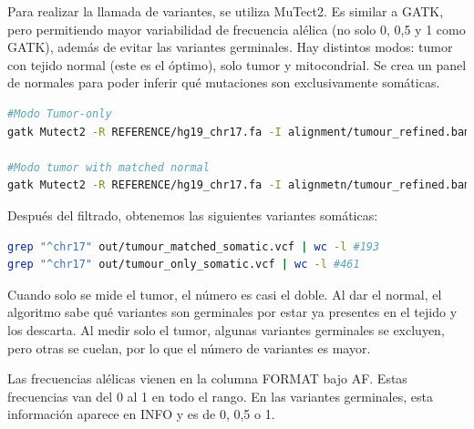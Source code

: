 Para realizar la llamada de variantes, se utiliza MuTect2. Es similar a GATK, pero permitiendo mayor variabilidad de frecuencia alélica (no solo 0, 0,5 y 1 como GATK), además de evitar las variantes germinales. Hay distintos modos: tumor con tejido normal (este es el óptimo), solo tumor y mitocondrial. Se crea un panel de normales para poder inferir qué mutaciones son exclusivamente somáticas. 
\begin{lstlisting}[language=bash]
#Modo Tumor-only 
gatk Mutect2 -R REFERENCE/hg19_chr17.fa -I alignment/tumour_refined.bam -O tumour_only_somatic.vcf

#Modo tumor with matched normal
gatk Mutect2 -R REFERENCE/hg19_chr17.fa -I alignmetn/tumour_refined.bam -I alignment/normal_refined.bam -normal Normal -O out/tumour_matched_somatic.vcf
\end{lstlisting}
 
Después del filtrado, obtenemos las siguientes variantes somáticas:
\begin{lstlisting}[language=bash]
grep "^chr17" out/tumour_matched_somatic.vcf | wc -l #193
grep "^chr17" out/tumour_only_somatic.vcf | wc -l #461
\end{lstlisting}
Cuando solo se mide el tumor, el número es casi el doble. Al dar el normal, el algoritmo sabe qué variantes son germinales por estar ya presentes en el tejido y los descarta. Al medir solo el tumor, algunas variantes germinales se excluyen, pero otras se cuelan, por lo que el número de variantes es mayor. 

Las frecuencias alélicas vienen en la columna FORMAT bajo AF. Estas frecuencias van del 0 al 1 en todo el rango. En las variantes germinales, esta información aparece en INFO y es de 0, 0,5 o 1.